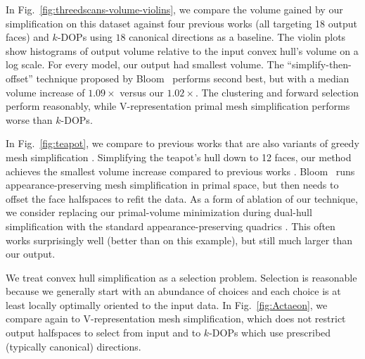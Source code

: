 \documentclass{egpubl}
\newcommand{\Vrep}{V-representation\xspace}
\begin{document}
In Fig.~\ref{fig:threedscans-volume-violins}, we compare the volume gained by our simplification on this dataset against four previous works (all targeting 18 output faces) and $k$-DOPs using $18$ canonical directions as a baseline.
The violin plots show histograms of output volume relative to the input convex hull's volume on a log scale.
For every model, our output had smallest volume. 
The ``simplify-then-offset'' technique proposed by Bloom~\cite{bloom2011convexhull} performs second best, but with a median volume increase of $1.09\times$ versus our $1.02\times$.
The clustering \cite{Schott25} and forward selection \cite{MuellerCK13} perform reasonably, while \Vrep primal mesh simplification \cite{TanLG17} performs worse than $k$-DOPs.


In Fig.~\ref{fig:teapot}, we compare to previous works that are also variants of greedy mesh simplification \cite{GarlandH97}.
Simplifying the teapot's hull down to 12 faces, our method achieves the smallest volume increase compared to previous works \cite{bloom2011convexhull, TanLG17}.
Bloom~\cite{bloom2011convexhull} runs appearance-preserving mesh simplification in primal space, but then needs to offset the face halfspaces to refit the data.
As a form of ablation of our technique, we consider replacing our primal-volume minimization during dual-hull simplification with the standard appearance-preserving quadrics \cite{GarlandH97}.
This often works surprisingly well (better than \cite{bloom2011convexhull,TanLG17} on this example), but still much larger than our output.

We treat convex hull simplification as a selection problem.
Selection is reasonable because we generally start with an abundance of choices and each choice is at least locally optimally oriented to the input data.
In Fig.~\ref{fig:Actaeon}, we compare again to \Vrep mesh simplification, which does not restrict output halfspaces to select from input and to $k$-DOPs which use prescribed (typically canonical) directions.
\end{document}
